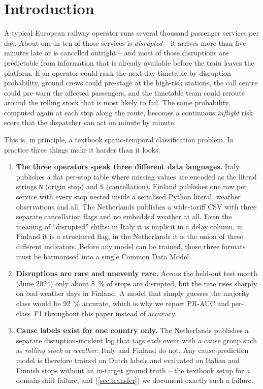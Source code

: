 \section{Introduction}
\label{sec:introduction}

A typical European railway operator runs several thousand passenger services per day. About one in ten of those services is \emph{disrupted} -- it arrives more than five minutes late or is cancelled outright -- and most of those disruptions are predictable from information that is already available before the train leaves the platform. If an operator could rank the next-day timetable by disruption probability, ground crews could pre-stage at the high-risk stations, the call centre could pre-warn the affected passengers, and the timetable team could reroute around the rolling stock that is most likely to fail. The same probability, computed again at each stop along the route, becomes a continuous \emph{inflight} risk score that the dispatcher can act on minute by minute.

This is, in principle, a textbook spatio-temporal classification problem. In practice three things make it harder than it looks.

\begin{enumerate}
    \item \textbf{The three operators speak three different data languages.} Italy publishes a flat per-stop table where missing values are encoded as the literal strings \texttt{N} (origin stop) and \texttt{S} (cancellation). Finland publishes one row per service with every stop nested inside a serialised Python literal, weather observations and all. The Netherlands publishes a wide-tariff CSV with three separate cancellation flags and no embedded weather at all. Even the meaning of ``disrupted'' shifts: in Italy it is implicit in a delay column, in Finland it is a structured flag, in the Netherlands it is the union of three different indicators. Before any model can be trained, those three formats must be harmonised into a single Common Data Model.
    \item \textbf{Disruptions are rare and unevenly rare.} Across the held-out test month (June 2024) only about \SI{8}{\percent} of stops are disrupted, but the rate rises sharply on bad-weather days in Finland. A model that simply guesses the majority class would be \SI{92}{\percent} accurate, which is why we report PR-AUC and per-class~F1 throughout this paper instead of accuracy.
    \item \textbf{Cause labels exist for one country only.} The Netherlands publishes a separate disruption-incident log that tags each event with a cause group such as \emph{rolling stock} or \emph{weather}. Italy and Finland do not. Any cause-prediction model is therefore trained on Dutch labels and evaluated on Italian and Finnish stops without an in-target ground truth -- the textbook setup for a domain-shift failure, and (\cref{sec:transfer}) we document exactly such a failure.
\end{enumerate}

